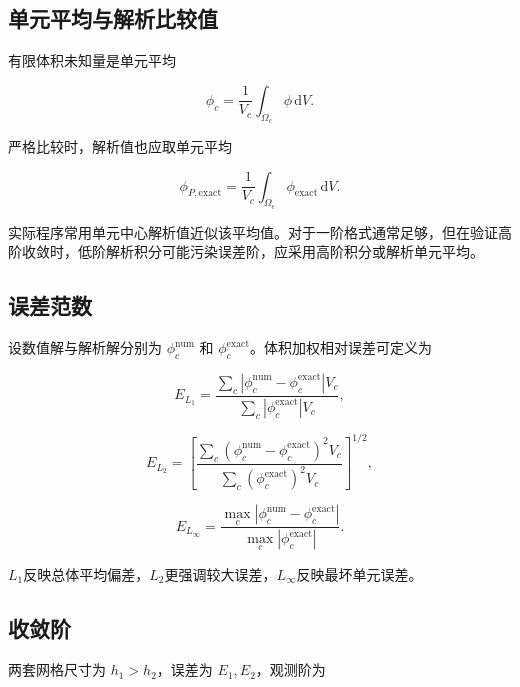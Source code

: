 \documentclass[UTF8,12pt,a4paper,fontset=fandol]{ctexart}
\numberwithin{equation}{section}
\newcommand{\dd}{\,\mathrm d}
\begin{document}
\subsection{单元平均与解析比较值}

有限体积未知量是单元平均

\begin{equation}
  \phi_c
  =
  \frac1{V_c}\int_{\Omega_c}\phi\dd V.
\end{equation}

严格比较时，解析值也应取单元平均

\begin{equation}
  \phi_{P,\mathrm{exact}}
  =
  \frac1{V_c}
  \int_{\Omega_c}
  \phi_{\mathrm{exact}}\dd V.
\end{equation}

实际程序常用单元中心解析值近似该平均值。对于一阶格式通常足够，但在验证高阶收敛时，低阶解析积分可能污染误差阶，应采用高阶积分或解析单元平均。

\subsection{误差范数}

设数值解与解析解分别为 $\phi_c^{\mathrm{num}}$ 和 $\phi_c^{\mathrm{exact}}$。体积加权相对误差可定义为

\begin{equation}
  E_{L_1}
  =
  \frac{
  \sum_c
  |\phi_c^{\mathrm{num}}-\phi_c^{\mathrm{exact}}|V_c
  }{
  \sum_c
  |\phi_c^{\mathrm{exact}}|V_c
  },
\end{equation}

\begin{equation}
  E_{L_2}
  =
  \left[
  \frac{
  \sum_c
  (\phi_c^{\mathrm{num}}-\phi_c^{\mathrm{exact}})^2V_c
  }{
  \sum_c
  (\phi_c^{\mathrm{exact}})^2V_c
  }
  \right]^{1/2},
\end{equation}

\begin{equation}
  E_{L_\infty}
  =
  \frac{
  \max_c|\phi_c^{\mathrm{num}}-\phi_c^{\mathrm{exact}}|
  }{
  \max_c|\phi_c^{\mathrm{exact}}|
  }.
\end{equation}

$L_1$反映总体平均偏差，$L_2$更强调较大误差，$L_\infty$反映最坏单元误差。

\subsection{收敛阶}

两套网格尺寸为 $h_1>h_2$，误差为 $E_1,E_2$，观测阶为
\end{document}
